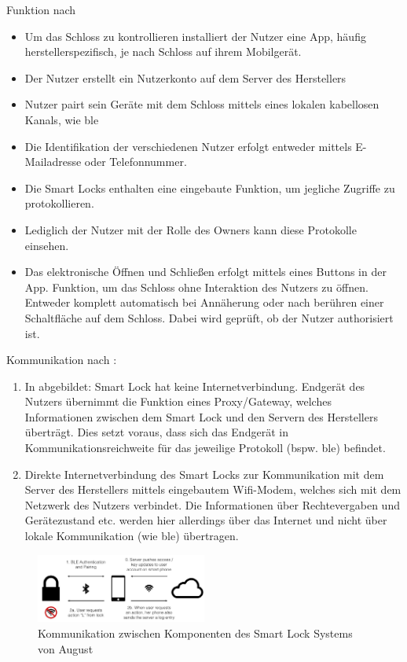 		Funktion nach \citeauthor{Ho2016}
		\begin{itemize}
		    \item Um das Schloss zu kontrollieren installiert der Nutzer eine App, häufig herstellerspezifisch, je nach Schloss auf ihrem Mobilgerät.
		    \item Der Nutzer erstellt ein Nutzerkonto auf dem Server des Herstellers
		    \item Nutzer pairt sein Geräte mit dem Schloss mittels eines lokalen kabellosen Kanals, wie \gls{ble}
		    \item Die Identifikation der verschiedenen Nutzer erfolgt entweder mittels E-Mailadresse oder Telefonnummer.
		    \item Die Smart Locks enthalten eine eingebaute Funktion, um jegliche Zugriffe zu protokollieren.
		    \item Lediglich der Nutzer mit der Rolle des Owners kann diese Protokolle einsehen.
		    \item Das elektronische Öffnen und Schließen erfolgt mittels eines Buttons in der App.
		        Funktion, um das Schloss ohne Interaktion des Nutzers zu öffnen.
		        Entweder komplett automatisch bei Annäherung oder nach berühren einer Schaltfläche auf dem Schloss.
		        Dabei wird geprüft, ob der Nutzer authorisiert ist.
		\end{itemize}

        Kommunikation nach \citeauthor{Ho2016}:
        \begin{enumerate}
            \item In  abgebildet: Smart Lock hat keine Internetverbindung.
                Endgerät des Nutzers übernimmt die Funktion eines Proxy/Gateway, welches Informationen zwischen dem Smart Lock und den Servern des Herstellers überträgt.
                Dies setzt voraus, dass sich das Endgerät in Kommunikationsreichweite für das jeweilige Protokoll (bspw. \gls{ble}) befindet.
            \item Direkte Internetverbindung des Smart Locks zur Kommunikation mit dem Server des Herstellers mittels eingebautem Wifi-Modem, welches sich mit dem Netzwerk des Nutzers verbindet.
                Die Informationen über Rechtevergaben und Gerätezustand etc. werden hier allerdings über das Internet und nicht über lokale Kommunikation (wie \gls{ble}) übertragen.
        \end{enumerate}
        
		\begin{figure}[H]
			\centering
			\includegraphics[width=0.5\textwidth]{paperNotes/ho2016_components}
			\caption{Kommunikation zwischen Komponenten des Smart Lock Systems von August}
			\label{fig:gateway}
		\end{figure}

